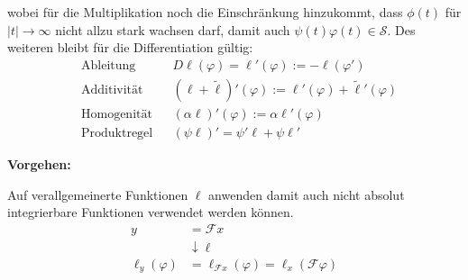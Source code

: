 wobei für die Multiplikation noch die Einschränkung hinzukommt, dass $\phi(t)$ für $|t| \rightarrow \infty$ nicht allzu stark wachsen darf, damit auch $\psi(t)\varphi(t) \in \mathcal{S} $.
Des weiteren bleibt für die Differentiation gültig:
\begin{align*}
     & \text{Ableitung}    &  & D\ell(\varphi)=\ell'(\varphi):=-\ell(\varphi')                           \\
     & \text{Additivität}  &  & (\ell+\tilde{\ell})'(\varphi):=\ell'(\varphi)+\widetilde{\ell}'(\varphi) \\
     & \text{Homogenität}  &  & (\alpha\ell)'(\varphi):=\alpha\ell'(\varphi)                             \\
     & \text{Produktregel} &  & (\psi\ell)'=\psi'\ell+\psi\ell'
\end{align*}

\textbf{Vorgehen:}

Auf verallgemeinerte Funktionen $\ell$ anwenden damit auch nicht absolut integrierbare Funktionen verwendet werden können.
\begin{align*}
    y               & =\mathcal{F}x                                            \\
                    & \downarrow \ell                                          \\
    \ell_y(\varphi) & =\ell_{\mathcal{F}x}(\varphi)=\ell_x(\mathcal{F}\varphi)
\end{align*}

